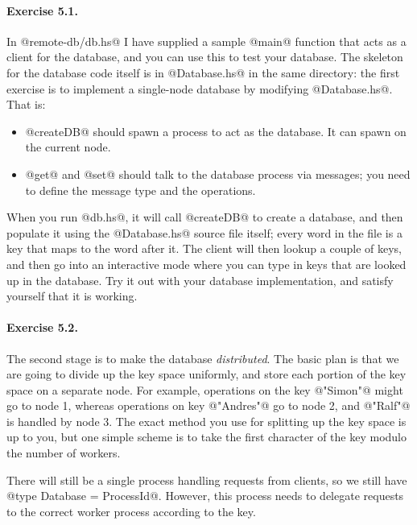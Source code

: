 \documentclass[11pt,a4paper]{article}
\begin{document}
\paragraph{Exercise 5.1.} In @remote-db/db.hs@ I have supplied a
sample @main@ function that acts as a client for the database, and you
can use this to test your database.  The skeleton for the database
code itself is in @Database.hs@ in the same directory: the first
exercise is to implement a single-node database by modifying
@Database.hs@.  That is:

\begin{itemize}
\item @createDB@ should spawn a process to act as the database.  It
can spawn on the current node.
\item @get@ and @set@ should talk to the database process via
messages; you need to define the message type and the operations.
\end{itemize}

When you run @db.hs@, it will call @createDB@ to create a database,
and then populate it using the @Database.hs@ source file itself; every
word in the file is a key that maps to the word after it.  The client
will then lookup a couple of keys, and then go into an interactive
mode where you can type in keys that are looked up in the database.
Try it out with your database implementation, and satisfy yourself
that it is working.

\paragraph{Exercise 5.2.} The second stage is to make the database
\emph{distributed}. The basic plan is that we are going to divide up
the key space uniformly, and store each portion of the key space on a
separate node.  For example, operations on the key @"Simon"@ might go
to node 1, whereas operations on key @"Andres"@ go to node 2, and
@"Ralf"@ is handled by node 3.  The exact method you use for splitting
up the key space is up to you, but one simple scheme is to take the
first character of the key modulo the number of workers.

There will still be a single process handling requests from clients,
so we still have @type Database = ProcessId@.  However, this process
needs to delegate requests to the correct worker process according to
the key.
\end{document}
